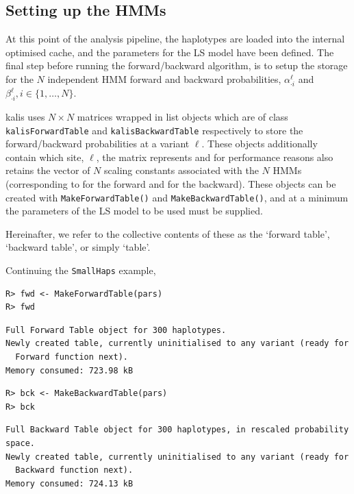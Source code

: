 \documentclass[a4paper]{article}
\newcommand{\pkg}[1]{{\fontseries{m}\fontseries{b}\selectfont #1}}
\begin{document}
\subsection*{Setting up the HMMs}
\label{setting-up-the-hmms}

At this point of the analysis pipeline, the haplotypes are loaded into the internal optimised cache, and the parameters for the LS model have been defined.
The final step before running the forward/backward algorithm, is to setup the storage for the \(N\) independent HMM forward and backward probabilities, \(\alpha^\ell_{\cdot i}\) and \(\beta^\ell_{\cdot i}, i \in \{1, \dots, N\}\).

\pkg{kalis} uses \(N \times N\) matrices wrapped in list objects which are of class \texttt{kalisForwardTable} and \texttt{kalisBackwardTable} respectively to store the forward/backward probabilities at a variant \(\ell\).
These objects additionally contain which site, \(\ell\), the matrix represents and for performance reasons also retains the vector of \(N\) scaling constants associated with the \(N\) HMMs (corresponding to  for the forward and  for the backward).
These objects can be created with \texttt{MakeForwardTable()} and \texttt{MakeBackwardTable()}, and at a minimum the parameters of the LS model to be used must be supplied.

Hereinafter, we refer to the collective contents of these as the `forward table', `backward table', or simply `table'.

Continuing the \texttt{SmallHaps} example,

\begin{verbatim}
R> fwd <- MakeForwardTable(pars)
R> fwd
\end{verbatim}
\begin{verbatim}
Full Forward Table object for 300 haplotypes.
Newly created table, currently uninitialised to any variant (ready for
  Forward function next).
Memory consumed: 723.98 kB
\end{verbatim}
\begin{verbatim}
R> bck <- MakeBackwardTable(pars)
R> bck
\end{verbatim}
\begin{verbatim}
Full Backward Table object for 300 haplotypes, in rescaled probability space.
Newly created table, currently uninitialised to any variant (ready for
  Backward function next).
Memory consumed: 724.13 kB
\end{verbatim}
\end{document}
